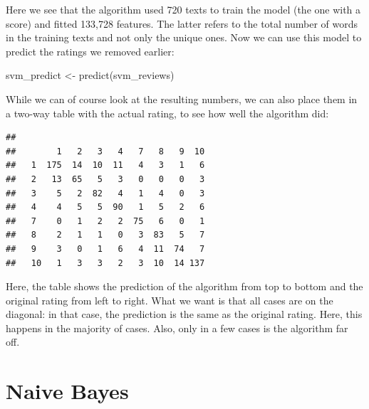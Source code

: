 \documentclass[
]{book}
\newenvironment{Shaded}{\begin{snugshade}}{\end{snugshade}}
\newcommand{\FunctionTok}[1]{\textcolor[rgb]{0.00,0.00,0.00}{#1}}
\newcommand{\NormalTok}[1]{#1}
\newcommand{\OtherTok}[1]{\textcolor[rgb]{0.56,0.35,0.01}{#1}}
\newcommand{\SpecialCharTok}[1]{\textcolor[rgb]{0.00,0.00,0.00}{#1}}
\begin{document}
Here we see that the algorithm used 720 texts to train the model (the one with a score) and fitted 133,728 features. The latter refers to the total number of words in the training texts and not only the unique ones. Now we can use this model to predict the ratings we removed earlier:

\begin{Shaded}
\begin{Highlighting}[]
\NormalTok{svm\_predict }\OtherTok{\textless{}{-}} \FunctionTok{predict}\NormalTok{(svm\_reviews)}
\end{Highlighting}
\end{Shaded}

While we can of course look at the resulting numbers, we can also place them in a two-way table with the actual rating, to see how well the algorithm did:

\begin{Shaded}
\end{Shaded}

\begin{verbatim}
##     
##        1   2   3   4   7   8   9  10
##   1  175  14  10  11   4   3   1   6
##   2   13  65   5   3   0   0   0   3
##   3    5   2  82   4   1   4   0   3
##   4    4   5   5  90   1   5   2   6
##   7    0   1   2   2  75   6   0   1
##   8    2   1   1   0   3  83   5   7
##   9    3   0   1   6   4  11  74   7
##   10   1   3   3   2   3  10  14 137
\end{verbatim}

Here, the table shows the prediction of the algorithm from top to bottom and the original rating from left to right. What we want is that all cases are on the diagonal: in that case, the prediction is the same as the original rating. Here, this happens in the majority of cases. Also, only in a few cases is the algorithm far off.

\hypertarget{naive-bayes}{%
\section{Naive Bayes}\label{naive-bayes}}
\end{document}
